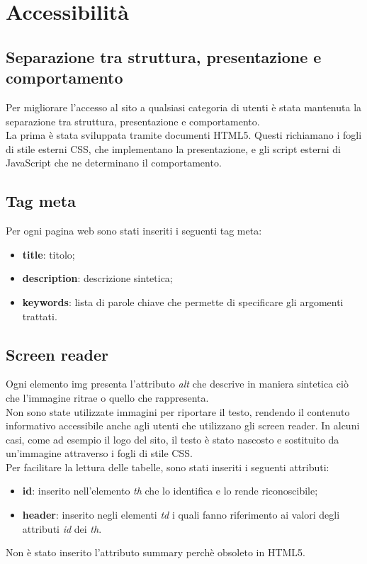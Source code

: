 \section{Accessibilità}
\subsection{Separazione tra struttura, presentazione e comportamento}
Per migliorare l'accesso al sito a qualsiasi categoria di utenti è stata mantenuta la separazione tra struttura, presentazione e comportamento. \\
La prima è stata sviluppata tramite documenti HTML5. Questi richiamano i fogli di stile esterni CSS, che implementano la presentazione, e gli script esterni di JavaScript che ne determinano il comportamento.
\subsection{Tag meta}
Per ogni pagina web sono stati inseriti i seguenti tag meta:
\begin{itemize}
	\item \textbf{title}: titolo;
	\item \textbf{description}: descrizione sintetica;
	\item \textbf{keywords}: lista di parole chiave che permette di specificare gli argomenti trattati. 
\end{itemize}
\subsection{Screen reader}
Ogni elemento img presenta l'attributo \textit{alt} che descrive in maniera sintetica ciò che l'immagine ritrae o quello che rappresenta. \\ 
Non sono state utilizzate immagini per riportare il testo, rendendo il contenuto informativo accessibile anche agli utenti che utilizzano gli screen reader. In alcuni casi, come ad esempio il logo del sito, il testo è stato nascosto e sostituito da un'immagine attraverso i fogli di stile CSS.\\
Per facilitare la lettura delle tabelle, sono stati inseriti i seguenti attributi:
\begin{itemize}
	\item{\textbf{id}}: inserito nell'elemento \textit{th} che lo identifica e lo rende riconoscibile;
	\item{\textbf{header}}: inserito negli elementi \textit{td} i quali fanno riferimento ai valori degli attributi \textit{id} dei \textit{th}.
\end{itemize}
Non è stato inserito l'attributo summary perchè obsoleto in HTML5.


